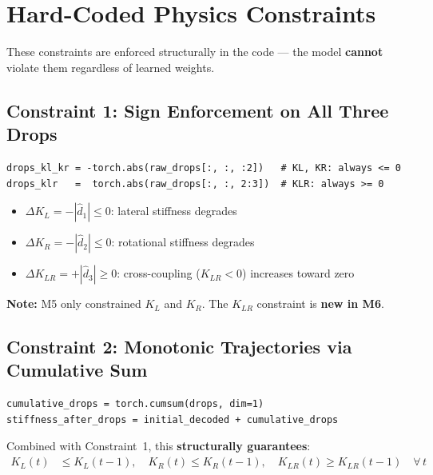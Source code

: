\documentclass[11pt,a4paper]{article}
\begin{document}
\section{Hard-Coded Physics Constraints}

These constraints are enforced structurally in the code --- the model \textbf{cannot} violate them regardless of learned weights.

\subsection{Constraint 1: Sign Enforcement on All Three Drops}

\begin{lstlisting}
drops_kl_kr = -torch.abs(raw_drops[:, :, :2])   # KL, KR: always <= 0
drops_klr   =  torch.abs(raw_drops[:, :, 2:3])  # KLR: always >= 0
\end{lstlisting}

\begin{itemize}[nosep]
    \item $\Delta K_L = -|\hat{d}_1| \leq 0$: lateral stiffness degrades
    \item $\Delta K_R = -|\hat{d}_2| \leq 0$: rotational stiffness degrades
    \item $\Delta K_{LR} = +|\hat{d}_3| \geq 0$: cross-coupling ($K_{LR} < 0$) increases toward zero
\end{itemize}

\textbf{Note:} M5 only constrained $K_L$ and $K_R$. The $K_{LR}$ constraint is \textbf{new in M6}.

\subsection{Constraint 2: Monotonic Trajectories via Cumulative Sum}

\begin{lstlisting}
cumulative_drops = torch.cumsum(drops, dim=1)
stiffness_after_drops = initial_decoded + cumulative_drops
\end{lstlisting}

Combined with Constraint~1, this \textbf{structurally guarantees}:
\begin{align}
    K_L(t) &\leq K_L(t-1), \quad K_R(t) \leq K_R(t-1), \quad K_{LR}(t) \geq K_{LR}(t-1) \quad \forall\, t
\end{align}
\end{document}

